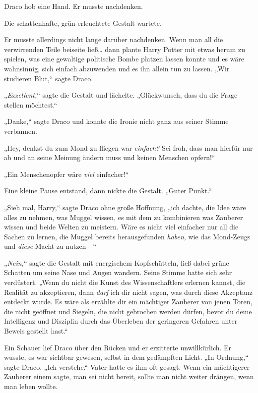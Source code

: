 {Draco hob eine Hand. Er musste nachdenken.

Die schattenhafte, grün-erleuchtete Gestalt wartete.

Er musste allerdings nicht lange darüber nachdenken. Wenn man all die verwirrenden Teile beiseite ließ… dann plante Harry Potter mit etwas herum zu spielen, was eine gewaltige politische Bombe platzen lassen konnte und es wäre wahnsinnig, sich einfach abzuwenden und es ihn allein tun zu lassen. „Wir studieren Blut,“ sagte Draco.

„\emph{Exzellent,}“ sagte die Gestalt und lächelte. „Glückwunsch, dass du die Frage stellen möchtest.“

„Danke,“ sagte Draco und konnte die Ironie nicht ganz aus seiner Stimme verbannen.

„Hey, denkst du zum Mond zu fliegen war \emph{einfach?} Sei froh, dass man hierfür nur ab und an seine Meinung ändern muss und keinen Menschen opfern!“

„Ein Menschenopfer wäre \emph{viel} einfacher!“

Eine kleine Pause entstand, dann nickte die Gestalt. „Guter Punkt.“

„Sieh mal, Harry,“ sagte Draco ohne große Hoffnung, „ich dachte, die Idee wäre alles zu nehmen, was Muggel wissen, es mit dem zu kombinieren was Zauberer wissen und beide Welten zu meistern. Wäre es nicht viel einfacher nur all die Sachen zu lernen, die Muggel bereits herausgefunden \emph{haben}, wie das Mond-Zeugs und \emph{diese} Macht zu nutzen—“

„\emph{Nein,}“ sagte die Gestalt mit energischem Kopfschütteln, ließ dabei grüne Schatten um seine Nase und Augen wandern. Seine Stimme hatte sich sehr verdüstert. „Wenn du nicht die Kunst des Wissenschaftlers erlernen kannst, die Realität zu akzeptieren, dann \emph{darf} ich dir nicht sagen, was durch diese Akzeptanz entdeckt wurde. Es wäre als erzählte dir ein mächtiger Zauberer von jenen Toren, die nicht geöffnet und Siegeln, die nicht gebrochen werden dürfen, bevor du deine Intelligenz und Disziplin durch das Überleben der geringeren Gefahren unter Beweis gestellt hast.“

Ein Schauer lief Draco über den Rücken und er erzitterte unwillkürlich. Er wusste, es war sichtbar gewesen, selbst in dem gedämpften Licht. „In Ordnung,“ sagte Draco. „Ich verstehe.“ Vater hatte es ihm oft gesagt. Wenn ein mächtigerer Zauberer einem sagte, man sei nicht bereit, sollte man nicht weiter drängen, wenn man leben wollte.

}
